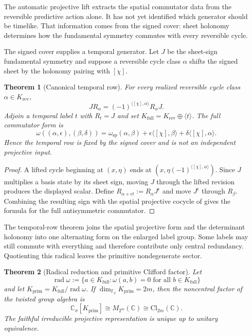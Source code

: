 \documentclass[11pt]{article}
\newtheorem{theorem}{Theorem}[section]
\theoremstyle{definition}
\theoremstyle{remark}
\newcommand{\C}{\mathbb C}
\newcommand{\F}{\mathbb F}
\newcommand{\rad}{\operatorname{rad}}
\newcommand{\Cl}{\mathrm{Cl}}
\newcommand{\rev}{\mathrm{rev}}
\newcommand{\spat}{\mathrm{sp}}
\begin{document}
The automatic projective lift extracts the spatial commutator data from the
reversible predictive action alone.  It has not yet identified which generator
should be timelike.  That information comes from the signed cover: sheet holonomy
determines how the fundamental symmetry commutes with every reversible cycle.

The signed cover supplies a temporal generator.  Let $J$ be the sheet-sign
fundamental symmetry and suppose a reversible cycle class $\alpha$ shifts the
signed sheet by the holonomy pairing with $[\chi]$.

\begin{theorem}[Canonical temporal row]
\label{thm:temporal-row}
For every realized reversible cycle class $\alpha\in K_{\rev}$,
\[
 JR_\alpha
 =(-1)^{\langle[\chi],\alpha\rangle}R_\alpha J.
\]
Adjoin a temporal label $t$ with $R_t=J$ and set
$K_{\mathrm{full}}=K_{\rev}\oplus\langle t\rangle$.  The full commutator form
is
\[
 \omega((\alpha,\epsilon),(\beta,\delta))
 =\omega_{\spat}(\alpha,\beta)
  +\epsilon\langle[\chi],\beta\rangle
  +\delta\langle[\chi],\alpha\rangle.
\]
Hence the temporal row is fixed by the signed cover and is not an independent
projective input.
\end{theorem}

\begin{proof}
A lifted cycle beginning at $(x,\eta)$ ends at
$(x,\eta(-1)^{\langle[\chi],\alpha\rangle})$.  Since $J$ multiplies a basis
state by its sheet sign, moving $J$ through the lifted revision produces the
displayed scalar.  Define
$R_{\alpha+\epsilon t}:=R_\alpha J^\epsilon$ and move $J^\epsilon$ through
$R_\beta$.  Combining the resulting sign with the spatial projective cocycle
of  gives the formula for the full antisymmetric
commutator.
\end{proof}

The temporal-row theorem joins the spatial projective form and the determinant
holonomy into one alternating form on the enlarged label group.  Some labels may
still commute with everything and therefore contribute only central redundancy.
Quotienting this radical leaves the primitive nondegenerate sector.

\begin{theorem}[Radical reduction and primitive Clifford factor]
\label{thm:clifford-factor}
Let
\[
 \rad\omega:=\{a\in K_{\mathrm{full}}:\omega(a,b)=0
                 \text{ for all }b\in K_{\mathrm{full}}\}
\]
and let $K_{\mathrm{prim}}=K_{\mathrm{full}}/\rad\omega$.  If
$\dim_{\F_2}K_{\mathrm{prim}}=2m$, then the noncentral factor of the twisted
group algebra is
\[
 \C_\sigma[K_{\mathrm{prim}}]
 \cong M_{2^m}(\C)
 \cong\Cl_{2m}(\C).
\]
The faithful irreducible projective representation is unique up to unitary
equivalence.
\end{theorem}
\end{document}
